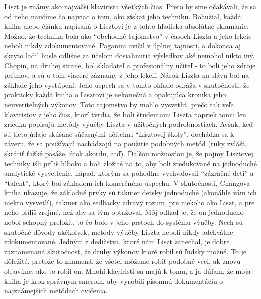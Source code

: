 Liszt je známy ako najväčší klavirista všetkých čias. Preto by sme očakávali, že sa od neho naučíme čo najviac o tom, ako získať jeho techniku. Bohužiaľ, každá kniha alebo článku napísaná o Lisztovi je z tohto hľadiska absolútne sklamanie. Možno, že technika bola ako “obchodné tajomstvo” v časoch Liszta a jeho lekcie neboli nikdy zdokumentované. Paganini cvičil v úplnej tajnosti, a dokonca aj skryto ladil husle odlišne za účelom dosiahnutia výsledkov aké nemohol nikto iný. Chopin, na druhej strane, bol skladateľ a profesionálny učiteľ - to boli jeho zdroje príjmov, a sú o tom viaceré záznamy z jeho lekcií. Nárok Liszta na slávu bol na základe jeho vystúpení. Jeho úspech sa v tomto ohľade odráža v skutočnosti, že prakticky každá kniha o Lisztovi je nekonečná a opakujúca kronika jeho neuveriteľných výkonov. Toto tajomstvo by mohlo vysvetliť, prečo tak veľa klaviristov z jeho čias, ktorí tvrdia, že boli študentami Liszta napriek tomu len zriedka popisujú metódy výučby Liszta v užitočných podrobnostiach. Avšak, keď sú tieto údaje skúšané súčasnými učiteľmi “Lisztovej školy”, dochádza sa k  záveru, že sa používajú nachádzajú na použitie podobných metód (ruky zvlášť, skrátiť ťažké pasáže, útok akordu, atď). Ďalšou možnosťou je, že pojmy Lisztovej techniky išli príliš hlboko a boli zložité na to, aby boli zredukované na jednoduché analytické vysvetlenie, nápad, ktorým sa pohodlne vychvaľovali “zázračné deti” a “talent”, ktorý bol základom ich komerčného úspechu. V skutočnosti, Changova kniha ukazuje, že základné prvky sú takmer detsky jednoduché (akonáhle vám ich niekto vysvetlí), takmer ako sedliacky zdravý rozum, pre niekoho ako Liszt, a pre neho príliš zrejmé, než aby sa tým obťažoval. Môj odhad je, že on jednoducho nebol schopný preložiť, to čo bolo v jeho prstoch do systému výučby. Nech sú skutočné dôvody akékoľvek, metódy výučby Liszta neboli nikdy adekvátne zdokumentované. Jedným z dedičstva, ktoré nám Liszt zanechal, je dobre zaznamenaná skutočnosť, že druhy výkonov ktoré robil sú ľudsky možné. To je dôležité, pretože to znamená, že všetci môžeme robiť podobné veci, ak znovu objavíme, ako to robil on. Mnohí klaviristi sa majú k tomu, a ja dúfam, že moja kniha je krok správnym smerom, aby vyrobili písomnú dokumentáciu o najznámejších metódach cvičenia. 

